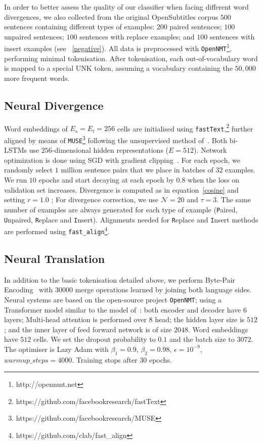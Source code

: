 \documentclass[11pt,a4paper]{article}
\begin{document}
In order to better assess the quality of our classifier when facing different word divergences, we also collected from the original OpenSubtitles corpus $500$ sentences containing different types of examples:
$200$ paired sentences;
$100$ unpaired sentences;
$100$ sentences with replace examples; and
$100$ sentences with insert examples (see \textsection~\ref{negative}).
All data is preprocessed with \texttt{OpenNMT}\footnote{http://opennmt.net}, performing minimal tokenisation. %
After tokenisation, each out-of-vocabulary word is mapped to a special UNK token, assuming a vocabulary containing the $50,000$ more frequent words.

\subsection{Neural Divergence}
\label{divergence}

Word embeddings of $E_s=E_t=256$ cells are initialised using \texttt{fastText},\footnote{https://github.com/facebookresearch/fastText} further aligned by means of \texttt{MUSE}\footnote{https://github.com/facebookresearch/MUSE} following the unsupervised method of~\citet{lample2018word}. Both bi-LSTMs use $256$-dimensional hidden representations ($E=512$).
Network optimization is done using SGD with gradient clipping~\cite{Pascanu:2013:DTR:3042817.3043083}. 
For each epoch, we randomly select $1$ million sentence pairs that we place in batches of $32$ examples.  
We run $10$ epochs and start decaying at each epoch by $0.8$ when the loss on validation set increases. 
Divergence is computed as in equation~\eqref{cosine} and setting $r=1.0$ ; 
For divergence correction, we use $\mathcal{N}=20$ and $\tau=3$.
The same number of examples are always generated for each type of example ({\texttt P}aired, {\texttt U}npaired, {\texttt R}eplace and {\texttt I}nsert). 
Alignments needed for {\texttt R}eplace and {\texttt I}nsert methods are performed using \texttt{fast\_align}\footnote{https://github.com/clab/fast\_align}.

\subsection{Neural Translation}
\label{translation}

In addition to the basic tokenisation detailed above, we perform Byte-Pair Encoding~\cite{Sennrich2016} with $30000$ merge operations learned by joining both language sides.
Neural systems are based on the open-source project  \texttt{OpenNMT};  using a Transformer model similar to the model of~\citet{vaswani2017attention}: both encoder and decoder have $6$ layers; Multi-head attention is performed over $8$ head;
the hidden layer size is $512$; and the inner layer of feed forward network is of size $2048$. 
Word embeddings have $512$ cells. We set the dropout probability to $0.1$ and the batch size to $3072$.
The optimiser is Lazy Adam with $\beta_1 = 0.9$, $\beta_2 = 0.98$, $\epsilon = 10^{-9}$, $warmup\_steps = 4000$. Training stops after $30$ epochs.
\end{document}
